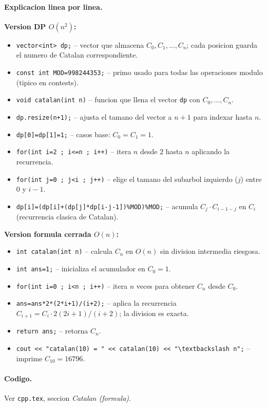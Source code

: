 \paragraph{Explicacion linea por linea.}
\textbf{Version DP $O(n^2)$:}
\begin{itemize}\setlength\itemsep{0pt}
	\item \verb|vector<int> dp;| -- vector que almacena $C_0, C_1, \dots, C_n$; cada posicion guarda el numero de Catalan correspondiente.
	\item \verb|const int MOD=998244353;| -- primo usado para todas las operaciones modulo (tipico en contests).
	\item \verb|void catalan(int n)| -- funcion que llena el vector \texttt{dp} con $C_0, \dots, C_n$.
	\item \verb|dp.resize(n+1);| -- ajusta el tamano del vector a $n+1$ para indexar hasta $n$.
	\item \verb|dp[0]=dp[1]=1;| -- casos base: $C_0 = C_1 = 1$.
	\item \verb|for(int i=2 ; i<=n ; i++)| -- itera $n$ desde $2$ hasta $n$ aplicando la recurrencia.
	\item \verb|for(int j=0 ; j<i ; j++)| -- elige el tamano del subarbol izquierdo ($j$) entre $0$ y $i-1$.
	\item \verb|dp[i]=(dp[i]+(dp[j]*dp[i-j-1])%MOD)%MOD;| -- acumula $C_j \cdot C_{i-1-j}$ en $C_i$ (recurrencia clasica de Catalan).
\end{itemize}
\textbf{Version formula cerrada $O(n)$:}
\begin{itemize}\setlength\itemsep{0pt}
	\item \verb|int catalan(int n)| -- calcula $C_n$ en $O(n)$ sin division intermedia riesgosa.
	\item \verb|int ans=1;| -- inicializa el acumulador en $C_0 = 1$.
	\item \verb|for(int i=0 ; i<n ; i++)| -- itera $n$ veces para obtener $C_n$ desde $C_0$.
	\item \verb|ans=ans*2*(2*i+1)/(i+2);| -- aplica la recurrencia $C_{i+1} = C_i \cdot 2(2i+1)/(i+2)$; la division es exacta.
	\item \verb|return ans;| -- retorna $C_n$.
	\item \verb|cout << "catalan(10) = " << catalan(10) << "\textbackslash n";| -- imprime $C_{10} = 16796$.
\end{itemize}

\paragraph{Codigo.}
Ver \texttt{cpp.tex}, seccion \textit{Catalan (formula)}.

\vspace{0.5em|||}
